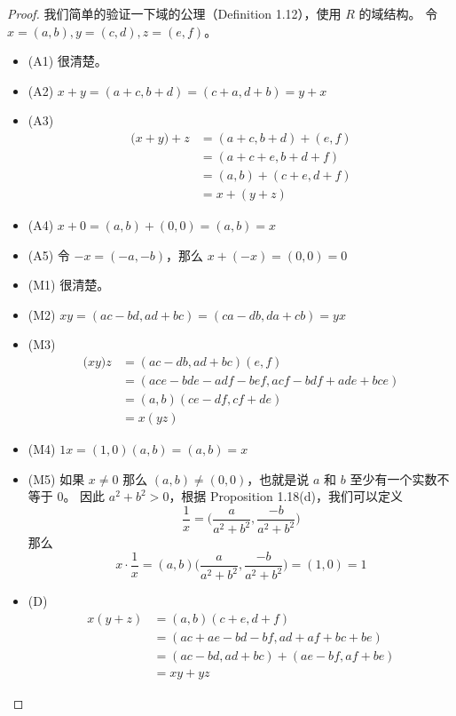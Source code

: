 \documentclass[../poma-notes.tex]{subfiles}
\begin{document}
\begin{proof}
	我们简单的验证一下域的公理（Definition 1.12），使用 $R$ 的域结构。
	令 $x=(a,b), y=(c,d), z=(e,f)$。
	\begin{itemize}
		\item[] (A1) 很清楚。
		\item[] (A2) $x+y = (a+c,b+d) = (c+a,d+b) = y+x$
		\item[] (A3)
			\vspace{-26pt}
			\begin{align*}
				\mathcal (x+y)+z & = (a+c,b+d) + (e,f) \\
				                 & = (a+c+e, b+d+f)    \\
				                 & = (a,b) + (c+e,d+f) \\
				                 & = x+(y+z)
			\end{align*}
		\item[] (A4) $x+0 = (a,b) + (0,0) = (a,b) = x$
		\item[] (A5) 令 $-x = (-a,-b)$，那么 $x+(-x) = (0,0) = 0$
		\item[] (M1) 很清楚。
		\item[] (M2) $xy = (ac-bd,ad+bc) = (ca-db,da+cb) = yx$
		\item[] (M3)
			\vspace{-26pt}
			\begin{align*}
				\mathcal (xy)z & = (ac-db,ad+bc)(e,f)                \\
				               & = (ace-bde-adf-bef,acf-bdf+ade+bce) \\
				               & = (a,b)(ce-df,cf+de)                \\
				               & = x(yz)
			\end{align*}
		\item[] (M4) $1x  =(1,0)(a,b) = (a,b) = x$
		\item[] (M5) 如果 $x \ne 0$ 那么 $(a,b) \ne (0,0)$，也就是说 $a$ 和 $b$ 至少有一个实数不等于 0。
			因此 $a^2+b^2>0$，根据 Proposition 1.18(d)，我们可以定义
			\[\frac{1}{x} = \bigl(\frac{a}{a^2+b^2}, \frac{-b}{a^2+b^2}\bigr)\]
			那么
			\[x \cdot \frac{1}{x} = (a,b)\bigl(\frac{a}{a^2+b^2}, \frac{-b}{a^2+b^2}\bigr) = (1,0) = 1\]
		\item[] (D)
			\vspace{-26pt}
			\begin{align*}
				\mathcal{} x(y+z) & = (a,b)(c+e,d+f)                \\
				                  & = (ac+ae-bd-bf,ad+af+bc+be)     \\
				                  & = (ac-bd,ad+bc) + (ae-bf,af+be) \\
				                  & = xy + yz
			\end{align*}
	\end{itemize}
\end{proof}
\end{document}
